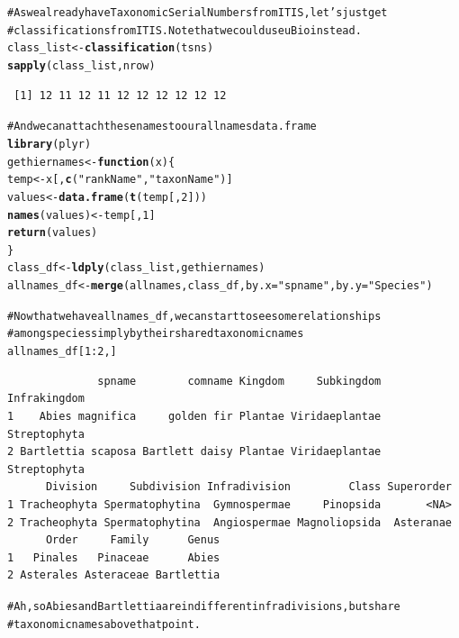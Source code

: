 \documentclass[letterpaper,superscriptaddress,showkeys,longbibliography,10pt]{revtex4-1}\usepackage{graphicx, color}
\makeatletter
\newcommand{\hlfunctioncall}[1]{\textcolor[rgb]{0.501960784313725,0,0.329411764705882}{\textbf{#1}}}%
\newcommand{\hlstring}[1]{\textcolor[rgb]{0.6,0.6,1}{#1}}%
\newcommand{\hlcomment}[1]{\textcolor[rgb]{0.180392156862745,0.6,0.341176470588235}{#1}}%
\newenvironment{kframe}{%
 \def\at@end@of@kframe{}%
 \ifinner\ifhmode%
  \def\at@end@of@kframe{\end{minipage}}%
  \begin{minipage}{\columnwidth}%
 \fi\fi%
 \def\FrameCommand##1{\hskip\@totalleftmargin \hskip-\fboxsep
 \colorbox{shadecolor}{##1}\hskip-\fboxsep
     \hskip-\linewidth \hskip-\@totalleftmargin \hskip\columnwidth}%
 \MakeFramed {\advance\hsize-\width
   \@totalleftmargin\z@ \linewidth\hsize
   \@setminipage}}%
 {\par\unskip\endMakeFramed%
 \at@end@of@kframe}
\newenvironment{knitrout}{}{} %
\makeatother
\begin{document}
\begin{knitrout}
\color{fgcolor}\begin{kframe}
\begin{alltt}
\hlcomment{# As we already have Taxonomic Serial Numbers from ITIS, let's just get}
\hlcomment{# classifications from ITIS. Note that we could use uBio instead.}
class_list <- \hlfunctioncall{classification}(tsns)
\hlfunctioncall{sapply}(class_list, nrow)
\end{alltt}
\begin{verbatim}
 [1] 12 11 12 11 12 12 12 12 12 12
\end{verbatim}
\begin{alltt}

\hlcomment{# And we can attach these names to our allnames data.frame}
\hlfunctioncall{library}(plyr)
gethiernames <- \hlfunctioncall{function}(x) \{
    temp <- x[, \hlfunctioncall{c}(\hlstring{"rankName"}, \hlstring{"taxonName"})]
    values <- \hlfunctioncall{data.frame}(\hlfunctioncall{t}(temp[, 2]))
    \hlfunctioncall{names}(values) <- temp[, 1]
    \hlfunctioncall{return}(values)
\}
class_df <- \hlfunctioncall{ldply}(class_list, gethiernames)
allnames_df <- \hlfunctioncall{merge}(allnames, class_df, by.x = \hlstring{"spname"}, by.y = \hlstring{"Species"})

\hlcomment{# Now that we have allnames_df, we can start to see some relationships}
\hlcomment{# among species simply by their shared taxonomic names}
allnames_df[1:2, ]
\end{alltt}
\begin{verbatim}
              spname        comname Kingdom     Subkingdom Infrakingdom
1    Abies magnifica     golden fir Plantae Viridaeplantae Streptophyta
2 Bartlettia scaposa Bartlett daisy Plantae Viridaeplantae Streptophyta
      Division     Subdivision Infradivision         Class Superorder
1 Tracheophyta Spermatophytina  Gymnospermae     Pinopsida       <NA>
2 Tracheophyta Spermatophytina  Angiospermae Magnoliopsida  Asteranae
      Order     Family      Genus
1   Pinales   Pinaceae      Abies
2 Asterales Asteraceae Bartlettia
\end{verbatim}
\begin{alltt}

\hlcomment{# Ah, so Abies and Bartlettia are in different infradivisions, but share}
\hlcomment{# taxonomic names above that point.}
\end{alltt}
\end{kframe}
\end{knitrout}
\end{document}
